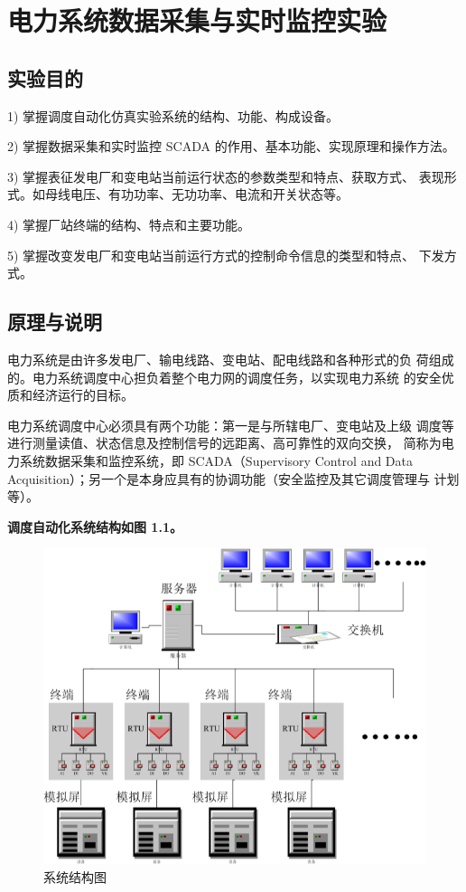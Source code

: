 \documentclass[a4paper]{ctexrep}
\begin{document}
        \tableofcontents %

        \chapter{电力系统数据采集与实时监控实验}
            \graphicspath{{figures_1/}} 
            \section{实验目的}
                1) 掌握调度自动化仿真实验系统的结构、功能、构成设备。

                2) 掌握数据采集和实时监控 SCADA 的作用、基本功能、实现原理和操作方法。 

                3) 掌握表征发电厂和变电站当前运行状态的参数类型和特点、获取方式、 表现形式。如母线电压、有功功率、无功功率、电流和开关状态等。 

                4) 掌握厂站终端的结构、特点和主要功能。 

                5) 掌握改变发电厂和变电站当前运行方式的控制命令信息的类型和特点、 下发方式。

            \section{原理与说明}
                电力系统是由许多发电厂、输电线路、变电站、配电线路和各种形式的负 荷组成的。电力系统调度中心担负着整个电力网的调度任务，以实现电力系统 的安全优质和经济运行的目标。 
                
                电力系统调度中心必须具有两个功能：第一是与所辖电厂、变电站及上级 调度等进行测量读值、状态信息及控制信号的远距离、高可靠性的双向交换， 简称为电力系统数据采集和监控系统，即 SCADA（Supervisory Control and Data Acquisition）；另一个是本身应具有的协调功能（安全监控及其它调度管理与 计划等）。 
                
                \textbf{调度自动化系统结构如图 1.1。}

                \begin{figure}[htbp]
                    \centering
                    \includegraphics[width=12cm]{1.png}
                    \caption{系统结构图}
                \end{figure}
                
\end{document}
